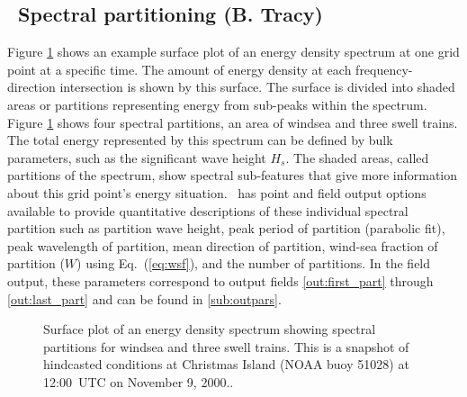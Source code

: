 \subsection{~Spectral partitioning \hfill {\rm (B. Tracy)}}
\vssub

Figure \ref{fig:partitions} shows an example surface plot of an energy density
spectrum at one grid point at a specific time.  The amount of energy density
at each frequency-direction intersection is shown by this surface.  The
surface is divided into shaded areas or partitions representing energy from
sub-peaks within the spectrum.  Figure \ref{fig:partitions} shows four
spectral partitions, an area of windsea and three swell trains.  The total
energy represented by this spectrum can be defined by bulk parameters, such as
the significant wave height $H_s$. The shaded areas, called partitions of the
spectrum, show spectral sub-features that give more information about this
grid point's energy situation.  \ws\ has point and field output options
available to provide quantitative descriptions of these individual spectral
partition such as partition wave height, peak period of partition (parabolic
fit), peak wavelength of partition, mean direction of partition, wind-sea
fraction of partition ($W$) using Eq.~(\ref{eq:wsf}), and the number of
partitions.  In the field output, these parameters correspond to output fields
\ref{out:first_part} through \ref{out:last_part} and can be found in
\para\ref{sub:outpars}.

\begin{figure} \begin{center}
\caption{Surface plot of an energy density spectrum showing spectral
         partitions for windsea and three swell trains.  This is a snapshot of
         hindcasted conditions at Christmas Island (NOAA buoy 51028) at
         12:00~UTC on November 9, 2000..}
         \label{fig:partitions} \botline
\end{center}
\end{figure}

